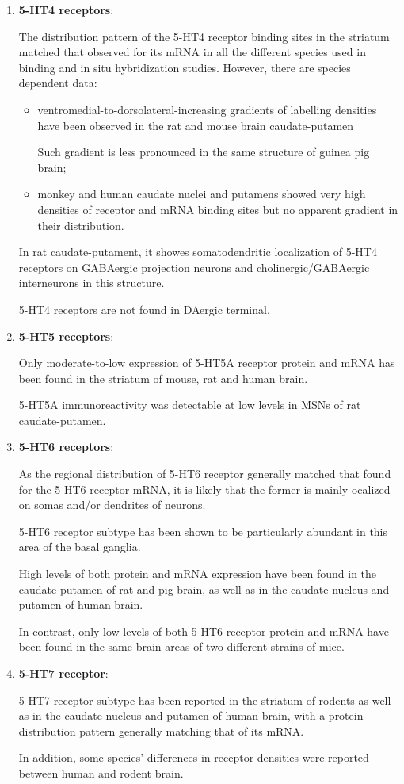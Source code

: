 \begin{enumerate}
  \item {\bf 5-HT4 receptors}:
  
The distribution pattern of the 5-HT4 receptor binding sites in the striatum
matched that observed for its mRNA in all the different species used in binding
and in situ hybridization studies. However, there are species dependent data:
\begin{itemize}
  \item  ventromedial-to-dorsolateral-increasing gradients of labelling
densities have been observed in the rat and mouse brain caudate-putamen
 
Such gradient is less pronounced in the same structure of guinea pig
brain;
 
  \item monkey and human caudate nuclei and putamens showed very high densities
of receptor and mRNA binding sites but no apparent gradient in their
distribution.

\end{itemize}

In rat caudate-putament, it showes somatodendritic localization of 5-HT4
receptors on GABAergic projection neurons and cholinergic/GABAergic interneurons
in this structure. 

5-HT4 receptors are not found in DAergic terminal.

  \item {\bf 5-HT5 receptors}:
  
Only moderate-to-low expression of 5-HT5A receptor protein and mRNA has been
found in the striatum of mouse, rat and human brain.

5-HT5A immunoreactivity was detectable at low levels in MSNs of rat
caudate-putamen.

  \item {\bf 5-HT6 receptors}:
  
As the regional distribution of 5-HT6 receptor generally matched that found for
the 5-HT6 receptor mRNA, it is likely that the former is mainly ocalized on
somas and/or dendrites of neurons.

5-HT6 receptor subtype has been shown to be particularly abundant in this
area of the basal ganglia.

High levels of both protein and mRNA expression have been found in the
caudate-putamen of rat and pig brain, as well as in the caudate
nucleus and putamen of human brain.

In contrast, only low levels of both 5-HT6 receptor protein and mRNA have been
found in the same brain areas of two different strains of mice.

  \item {\bf 5-HT7 receptor}:

5-HT7 receptor subtype has been reported in the striatum of rodents as well as
in the caudate nucleus and putamen of human brain, with a protein distribution
pattern generally matching that of its mRNA.

In addition, some species' differences in receptor densities were reported
between human and rodent brain.

\end{enumerate}


